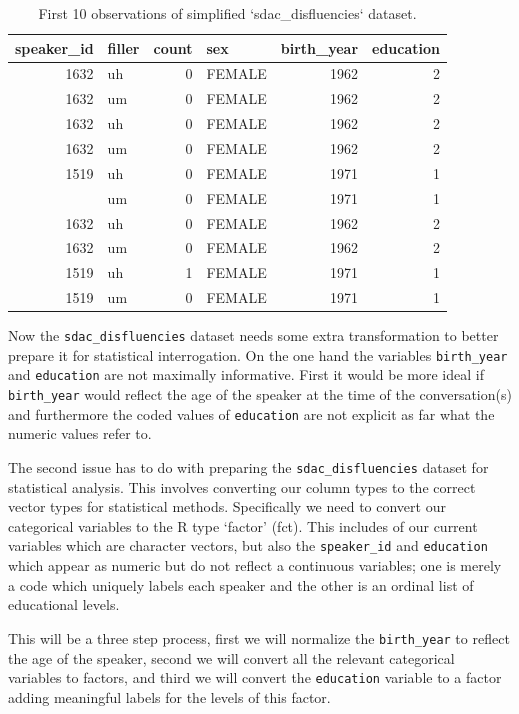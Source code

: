 \documentclass[
]{article}
\begin{document}
\begin{table}

\caption{\label{tab:i-sdac-disfluencies-preview}First 10 observations of simplified `sdac_disfluencies` dataset.}
\centering
\begin{tabular}[t]{rlrlrr}
\toprule
speaker\_id & filler & count & sex & birth\_year & education\\
\midrule
1632 & uh & 0 & FEMALE & 1962 & 2\\
1632 & um & 0 & FEMALE & 1962 & 2\\
1632 & uh & 0 & FEMALE & 1962 & 2\\
1632 & um & 0 & FEMALE & 1962 & 2\\
1519 & uh & 0 & FEMALE & 1971 & 1\\
\addlinespace
1519 & um & 0 & FEMALE & 1971 & 1\\
1632 & uh & 0 & FEMALE & 1962 & 2\\
1632 & um & 0 & FEMALE & 1962 & 2\\
1519 & uh & 1 & FEMALE & 1971 & 1\\
1519 & um & 0 & FEMALE & 1971 & 1\\
\bottomrule
\end{tabular}
\end{table}

Now the \texttt{sdac\_disfluencies} dataset needs some extra transformation to better prepare it for statistical interrogation. On the one hand the variables \texttt{birth\_year} and \texttt{education} are not maximally informative. First it would be more ideal if \texttt{birth\_year} would reflect the age of the speaker at the time of the conversation(s) and furthermore the coded values of \texttt{education} are not explicit as far what the numeric values refer to.

The second issue has to do with preparing the \texttt{sdac\_disfluencies} dataset for statistical analysis. This involves converting our column types to the correct vector types for statistical methods. Specifically we need to convert our categorical variables to the R type `factor' (fct). This includes of our current variables which are character vectors, but also the \texttt{speaker\_id} and \texttt{education} which appear as numeric but do not reflect a continuous variables; one is merely a code which uniquely labels each speaker and the other is an ordinal list of educational levels.

This will be a three step process, first we will normalize the \texttt{birth\_year} to reflect the age of the speaker, second we will convert all the relevant categorical variables to factors, and third we will convert the \texttt{education} variable to a factor adding meaningful labels for the levels of this factor.
\end{document}
